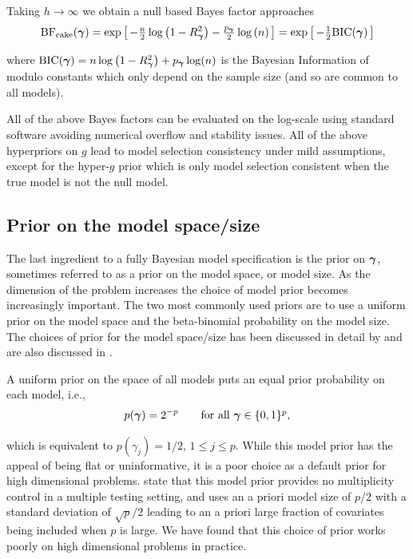 \begin{itemize}
	\noindent Taking $h\to\infty$ we obtain a null based Bayes factor approaches
	\begin{equation}\label{eq:marginalLikelihoodCake}
	\displaystyle \mbox{BF}_{\mbox{\scriptsize cake}}({\boldsymbol \gamma})
	=
	\exp\left[ \,
	-\tfrac{n}{2}\log\left( 1 - R_{\boldsymbol \gamma}^2 \right) 
	- \tfrac{p_{\boldsymbol \gamma}}{2}\log\left(n \right) \,
	\right] = \exp\left[ \, -\tfrac{1}{2}\mbox{BIC}({\boldsymbol \gamma}) \,\right]
	\end{equation}
	
	\noindent where $\mbox{BIC}({\boldsymbol \gamma}) = n\log\left( 1 - R_{\boldsymbol \gamma}^2 \right) + p_{\boldsymbol \gamma} \log(n)$ is the Bayesian 
	Information of \cite{Schwarz1978} modulo constants which only depend on the sample size (and so are common to all models). 
\end{itemize}

\noindent All of the above Bayes factors can be evaluated on the log-scale using standard software avoiding numerical overflow and stability issues.
All of the above hyperpriors on $g$ lead to model selection consistency under mild assumptions, except for 
the hyper-$g$ prior which is only model selection consistent when the true model is
not the null model. 

\subsection{Prior on the model space/size}

The last ingredient to a fully Bayesian model specification is the prior on ${\boldsymbol \gamma}$,
sometimes referred to as a prior on the model space, or model size.
As the dimension of the problem increases the choice of model prior becomes
increasingly important. The two most commonly 
used priors are to use a uniform prior on the model space
and the beta-binomial probability on the model size.
The choices of prior for the model space/size has been discussed
in detail by \cite{scott2010} and are also discussed in \cite{castillo2015}.

A uniform prior on the space of all models puts an equal prior probability on each model, i.e., 
$$
\displaystyle p({\boldsymbol \gamma}) = 2^{-p} \qquad \mbox{for all ${\boldsymbol \gamma}\in\{0,1\}^p$},
$$

\noindent which is equivalent to $p(\gamma_j) = 1/2$, $1\le j\le p$. While this model prior
has the appeal of being flat or uninformative, it is a poor  choice as a default prior for high dimensional 
problems. \cite{scott2010} state that this model prior provides no multiplicity control in a multiple 
testing setting, and uses an a priori model size of $p/2$ with a standard deviation of $\sqrt{p}/2$ 
leading to an a priori large fraction of covariates being included when $p$ is large. We have found that this choice
of prior works poorly on high dimensional problems in practice.

